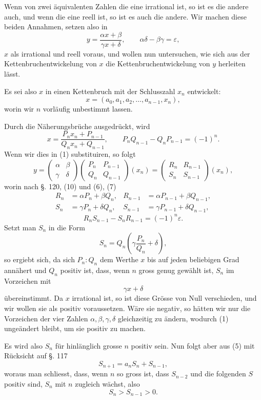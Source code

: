 \documentclass[11pt]{article}
\begin{document}
Wenn von zwei äquivalenten Zahlen die eine irrational ist, so ist es die andere auch, und wenn die eine reell ist, so ist es auch die andere. Wir machen diese beiden Annahmen, setzen also in
\[
\tag{1}        y=\frac{\alpha x+\beta}{\gamma x+\delta},
        \qquad
        \alpha\delta-\beta\gamma=\varepsilon,
\]
$x$ als irrational und reell voraus, und wollen nun untersuchen, wie sich aus der Kettenbruchentwickelung von $x$ die Kettenbruchentwickelung von $y$ herleiten lässt.

Es sei also $x$ in einen Kettenbruch mit der Schlusszahl $x_n$ entwickelt:
\[
\tag{2}        x=(a_0,a_1,a_2,\ldots,a_{n-1},x_n),
\]
worin wir $n$ vorläufig unbestimmt lassen.

Durch die Näherungsbrüche ausgedrückt, wird
\[
\tag{3}        x=\frac{P_nx_n+P_{n-1}}{Q_nx_n+Q_{n-1}},
        \qquad
        P_nQ_{n-1}-Q_nP_{n-1}=(-1)^n.
\]
Wenn wir dies in (1) substituiren, so folgt
\[
\tag{4}
 y=\begin{pmatrix}\alpha&\beta\\ \gamma&\delta\end{pmatrix}
   \begin{pmatrix}P_n&P_{n-1}\\ Q_n&Q_{n-1}\end{pmatrix}(x_n)
 =\begin{pmatrix}R_n&R_{n-1}\\ S_n&S_{n-1}\end{pmatrix}(x_n),
\]
worin nach §. 120, (10) und (6), (7)
\[
\tag{5}\begin{aligned}
R_n&=\alpha P_n+\beta Q_n,&
R_{n-1}&=\alpha P_{n-1}+\beta Q_{n-1},\\
S_n&=\gamma P_n+\delta Q_n,&
S_{n-1}&=\gamma P_{n-1}+\delta Q_{n-1},
\end{aligned}
\]
\[
\tag{6}        R_nS_{n-1}-S_nR_{n-1}=(-1)^n\varepsilon.
\]
Setzt man $S_n$ in die Form
\[
        S_n=Q_n\left(\gamma\frac{P_n}{Q_n}+\delta\right),
\]
so ergiebt sich, da sich $P_n:Q_n$ dem Werthe $x$ bis auf jeden beliebigen Grad annähert und $Q_n$ positiv ist, dass, wenn $n$ gross genug gewählt ist, $S_n$ im Vorzeichen mit
\[
        \gamma x+\delta
\]
übereinstimmt. Da $x$ irrational ist, so ist diese Grösse von Null verschieden, und wir wollen sie als positiv voraussetzen. Wäre sie negativ, so hätten wir nur die Vorzeichen der vier Zahlen $\alpha,\beta,\gamma,\delta$ gleichzeitig zu ändern, wodurch (1) ungeändert bleibt, um sie positiv zu machen.

Es wird also $S_n$ für hinlänglich grosse $n$ positiv sein. Nun folgt aber aus (5) mit Rücksicht auf §. 117
\[
        S_{n+1}=a_nS_n+S_{n-1},
\]
woraus man schliesst, dass, wenn $n$ so gross ist, dass $S_{n-2}$ und die folgenden $S$ positiv sind, $S_n$ mit $n$ zugleich wächst, also
\[
\tag{7}        S_n>S_{n-1}>0.
\]
\end{document}
